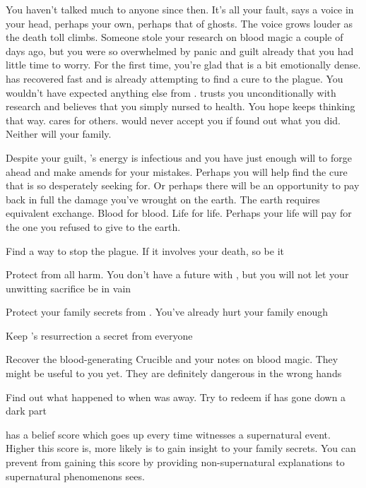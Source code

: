 \documentclass[char]{Pestilence}
\begin{document}
You haven't talked much to anyone since then. It's all your fault, says a voice in your head, perhaps your own, perhaps that of ghosts. The voice grows louder as the death toll climbs. Someone stole your research on blood magic a couple of days ago, but you were so overwhelmed by panic and guilt already that you had little time to worry. For the first time, you're glad that \cOutsider{} is a bit emotionally dense. \cOutsider{\They} has recovered fast and is already attempting to find a cure to the plague. You wouldn't have expected anything else from \cOutsider{\them}. \cOutsider{\They} trusts you unconditionally with \cOutsider{\their} research and believes that you simply nursed \cOutsider{\them} to health. You hope \cOutsider{\they} keeps thinking that way. \cOutsider{} cares for others. \cOutsider{\They} would never accept you if \cOutsider{\they} found out what you did. Neither will your family.

Despite your guilt, \cOutsider{}'s energy is infectious and you have just enough will to forge ahead and make amends for your mistakes. Perhaps you will help find the cure that \cOutsider{} is so desperately seeking for. Or perhaps there will be an opportunity to pay back in full the damage you've wrought on the earth. The earth requires equivalent exchange. Blood for blood. Life for life. Perhaps your life will pay for the one you refused to give to the earth.  

\begin{itemz}[Goals]
	\item Find a way to stop the plague. If it involves your death, so be it
	\item Protect \cOutsider{} from all harm. You don't have a future with \cOutsider{\them}, but you will not let your unwitting sacrifice be in vain
	\item Protect your family secrets from \cOutsider{}. You've already hurt your family enough
	\item Keep \cOutsider{}'s resurrection a secret from everyone
	\item Recover the blood-generating Crucible and your notes on blood magic. They might be useful to you yet. They are definitely dangerous in the wrong hands
	\item Find out what happened to \cApprentice{} when \cApprentice {\they} was away. Try to redeem \cApprentice{\them} if \cApprentice{\they} has gone down a dark part
\end{itemz}

\begin{itemz}[Notes]
	\item \cOutsider{} has a belief score which goes up every time \cOutsider{\they} witnesses a supernatural event. Higher this score is, more likely \cOutsider{\they} is to gain insight to your family secrets. You can prevent \cOutsider{\them} from gaining this score by providing non-supernatural explanations to supernatural phenomenons \cOutsider{\they} sees. 
\end{itemz}
\end{document}

